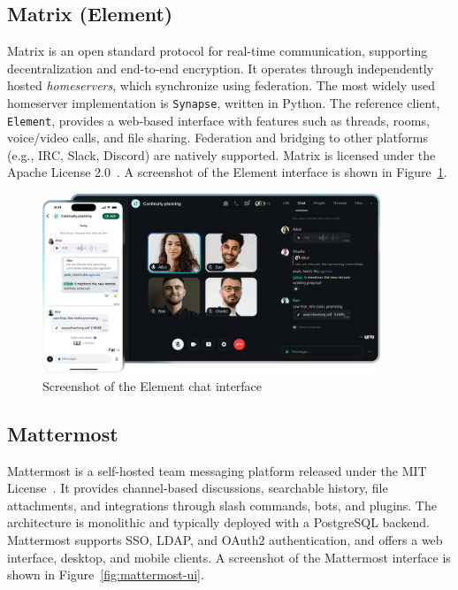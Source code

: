 \subsection*{Matrix (Element)}

Matrix is an open standard protocol for real-time communication, supporting decentralization and end-to-end encryption. It operates through independently hosted \emph{homeservers}, which synchronize using federation. The most widely used homeserver implementation is \texttt{Synapse}, written in Python. The reference client, \texttt{Element}, provides a web-based interface with features such as threads, rooms, voice/video calls, and file sharing. Federation and bridging to other platforms (e.g., IRC, Slack, Discord) are natively supported. Matrix is licensed under the Apache License 2.0~\cite{matrix-docs}. A screenshot of the Element interface is shown in Figure~\ref{fig:element-ui}.

\begin{figure}[H]
  \centering
  \includegraphics[width=0.9\textwidth]{imaxes/element-ui.png}
  \caption{Screenshot of the Element chat interface}
  \label{fig:element-ui}
\end{figure}

\subsection*{Mattermost}

Mattermost is a self-hosted team messaging platform released under the MIT License~\cite{mattermost-docs}. It provides channel-based discussions, searchable history, file attachments, and integrations through slash commands, bots, and plugins. The architecture is monolithic and typically deployed with a PostgreSQL backend. Mattermost supports SSO, LDAP, and OAuth2 authentication, and offers a web interface, desktop, and mobile clients. A screenshot of the Mattermost interface is shown in Figure~\ref{fig:mattermost-ui}.

